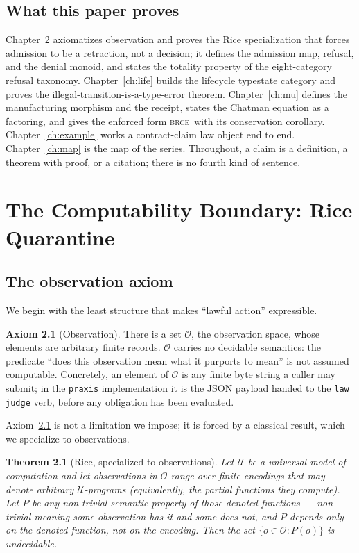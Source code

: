 \documentclass[11pt,oneside]{book}
\theoremstyle{definition}
\newtheorem{axiom}{Axiom}[chapter]
\theoremstyle{plain}
\newtheorem{theorem}{Theorem}[chapter]
\theoremstyle{remark}
\newcommand{\Obs}{\mathcal{O}}                 %
\newcommand{\BRCE}{\textsc{brce}}
\newcommand{\code}[1]{\texttt{#1}}
\begin{document}
\section{What this paper proves}

Chapter~\ref{ch:oar} axiomatizes observation and proves the Rice specialization that forces
admission to be a retraction, not a decision; it defines the admission map, refusal, and
the denial monoid, and states the totality property of the eight-category refusal taxonomy.
Chapter~\ref{ch:life} builds the lifecycle typestate category and proves the
illegal-transition-is-a-type-error theorem. Chapter~\ref{ch:mu} defines the manufacturing
morphism and the receipt, states the Chatman equation as a factoring, and gives the
enforced form \BRCE\ with its conservation corollary. Chapter~\ref{ch:example} works a
contract-claim law object end to end. Chapter~\ref{ch:map} is the map of the series.
Throughout, a claim is a definition, a theorem with proof, or a citation; there is no
fourth kind of sentence.

\chapter{The Computability Boundary: Rice Quarantine}
\label{ch:oar}

\section{The observation axiom}

We begin with the least structure that makes ``lawful action'' expressible.

\begin{axiom}[Observation]\label{ax:obs}
There is a set $\Obs$, the observation space, whose elements are arbitrary finite records.
$\Obs$ carries no decidable semantics: the predicate ``does this observation mean what it
purports to mean'' is not assumed computable. Concretely, an element of $\Obs$ is any
finite byte string a caller may submit; in the \code{praxis} implementation it is the JSON
payload handed to the \code{law judge} verb, before any obligation has been evaluated.
\end{axiom}

Axiom~\ref{ax:obs} is not a limitation we impose; it is forced by a classical result, which
we specialize to observations.

\begin{theorem}[Rice, specialized to observations]\label{thm:rice}
Let $\mathcal{U}$ be a universal model of computation and let observations in $\Obs$ range
over finite encodings that may denote arbitrary $\mathcal{U}$-programs (equivalently, the
partial functions they compute). Let $P$ be any non-trivial semantic property of those
denoted functions --- non-trivial meaning some observation has it and some does not, and
$P$ depends only on the denoted function, not on the encoding. Then the set
$\{o\in\Obs : P(o)\}$ is undecidable.
\end{theorem}
\end{document}
